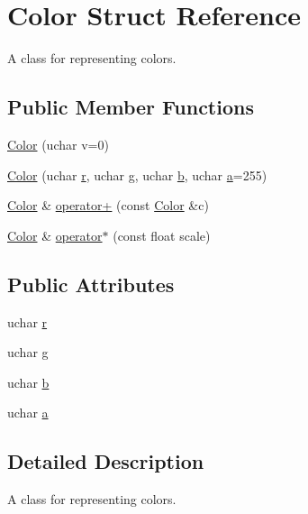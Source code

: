 \hypertarget{struct_color}{\section{Color Struct Reference}
\label{struct_color}
}


A class for representing colors.  


\subsection*{Public Member Functions}
\begin{DoxyCompactItemize}
\item 
\hyperlink{struct_color_a5d84a194e4f27184502776085c10e693}{Color} (uchar v=0)
\item 
\hyperlink{struct_color_a21de3e4d18a75c2a52d16d1eedaab678}{Color} (uchar \hyperlink{struct_color_abca4da3a265e1fa1da7b86a7d3cc2eef}{r}, uchar \hyperlink{struct_color_a33fc8a286048ddc401f94310eeeee25f}{g}, uchar \hyperlink{struct_color_a1257f1682341fca1120d6d2d6955bd7f}{b}, uchar \hyperlink{struct_color_ac4b9d51a5d2ecc82aa55bff73e6c088d}{a}=255)
\item 
\hyperlink{struct_color}{Color} \& \hyperlink{struct_color_aab90b3eeb2b4c9fd8974e90aca21b0a7}{operator+} (const \hyperlink{struct_color}{Color} \&c)
\item 
\hyperlink{struct_color}{Color} \& \hyperlink{struct_color_a769d9fe7cb73ff12938aa350efb578b7}{operator$\ast$} (const float scale)
\end{DoxyCompactItemize}
\subsection*{Public Attributes}
\begin{DoxyCompactItemize}
\item 
uchar \hyperlink{struct_color_abca4da3a265e1fa1da7b86a7d3cc2eef}{r}
\item 
uchar \hyperlink{struct_color_a33fc8a286048ddc401f94310eeeee25f}{g}
\item 
uchar \hyperlink{struct_color_a1257f1682341fca1120d6d2d6955bd7f}{b}
\item 
uchar \hyperlink{struct_color_ac4b9d51a5d2ecc82aa55bff73e6c088d}{a}
\end{DoxyCompactItemize}


\subsection{Detailed Description}
A class for representing colors. 

